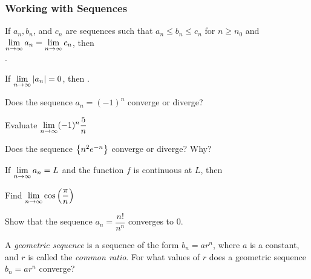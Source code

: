 \documentclass[notes]{subfiles}
\begin{document}
	\subsubsection*{Working with Sequences}
		\begin{thm}
			If $a_n,b_n$, and $c_n$ are sequences such that $a_n\leq b_n\leq c_n$ for $n\geq n_0$ and $\displaystyle \lim_{n\to\infty} a_n = \lim_{n\to\infty} c_n$, then\\[20pt] .
		\end{thm}
		
		\begin{thm}
			If $\displaystyle \lim_{n\to\infty} |a_n| = 0$, then .
		\end{thm}
		
		\begin{ex}
			Does the sequence $a_n = (-1)^n$ converge or diverge?
		\end{ex}
			
		\begin{ex}
			Evaluate $\displaystyle \lim_{n\to\infty} (-1)^n\dfrac{5}{n}$
		\end{ex}	
			
		\begin{ex}
			Does the sequence $\left\lbrace n^2e^{-n} \right\rbrace$ converge or diverge?  Why?
		\end{ex}
			\newpage
			
		\begin{thm}
			If $\displaystyle \lim_{n\to\infty} a_n = L$ and the function $f$ is continuous at $L$, then\\[15pt]
				\[\]
		\end{thm}
		
		\begin{ex}
			Find $\displaystyle \lim_{n\to\infty} \cos\left( \dfrac{\pi}{n}\right)$
		\end{ex}
		
		\begin{ex}
			Show that the sequence $a_n =\dfrac{n!}{n^n}$ converges to 0.
		\end{ex}		
			
		\begin{ex}
			A \emph{geometric sequence} is a sequence of the form $b_n = ar^n$, where $a$ is a constant, and $r$ is called the \emph{common ratio}.  For what values of $r$ does a geometric sequence $b_n = ar^n$ converge?
		\end{ex}
			\newpage
			
\end{document}
